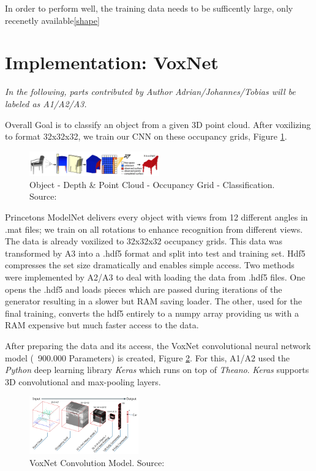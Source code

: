 \documentclass[10pt,twocolumn,letterpaper]{article}
\begin{document}
In order to perform well, the training data needs to be sufficently large, only recenetly available\ref{shape}

\section{Implementation: VoxNet \cite{voxnet}}

\textit{In the following, parts contributed by Author Adrian/Johannes/Tobias will be labeled 
as A1/A2/A3.}

Overall Goal is to classify an object from a given 3D point cloud. After voxilizing to format 32x32x32, we train our CNN on these occupancy grids, Figure \ref{fig:algo}.

\begin{figure}[h]
	\label{fig:algo}
	\centering
	\includegraphics[width=0.5\textwidth]{figures/algo}
	\caption{ \newline Object - Depth \& Point Cloud - Occupancy Grid - Classification. Source: \cite{shape}}
\end{figure}

Princetons ModelNet delivers every object with views from 12 different angles in .mat files; we train on all rotations to enhance recognition from 
different views. The data is already voxilized to 32x32x32 occupancy grids.
This data was transformed by A3 into a .hdf5 format and split into test and training set. Hdf5 compresses the set size dramatically and enables simple access.
Two methods were implemented by A2/A3 to deal with loading the data from .hdf5 files. One opens the .hdf5 and loads pieces which are passed during iterations of the generator resulting 
in a slower but RAM saving loader. The other, used for the final training, converts the hdf5 entirely to a numpy array providing us with a RAM expensive but much faster access to the data.

After preparing the data and its access, the VoxNet convolutional neural network model (~900.000 Parameters) is created, Figure \ref{fig:model}. For this, A1/A2 used the \textit{Python} deep learning library \textit{Keras} which runs on top of \textit{Theano}. \textit{Keras} supports 3D convolutional and max-pooling layers. 

\begin{figure}[h]
	\label{fig:model}
	\centering
	\includegraphics[width=0.42\textwidth]{figures/model}
	\caption{VoxNet Convolution Model. Source: \cite{mature}}
\end{figure}
\end{document}
